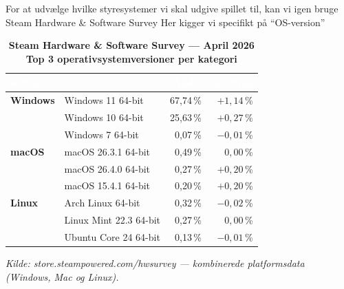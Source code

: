 For at udvælge hvilke styresystemer vi skal udgive spillet til, kan vi igen bruge Steam Hardware \& Software Survey Her kigger vi specifikt på ``OS-version''

\begin{table}[H]
\centering
\caption*{\large\bfseries Steam Hardware \& Software Survey --- April 2026\\[4pt]
\normalsize\normalfont Top 3 operativsystemversioner per kategori}
\vspace{6pt}
\renewcommand{\arraystretch}{1.4}
\begin{tabular}{
  l
  l
  r
  r
}
\toprule
\rowcolor{steamblue}
\textcolor{white}{\textbf{Kategori}} &
\textcolor{white}{\textbf{OS-version}} &
\textcolor{white}{\textbf{Andel}} &
\textcolor{white}{\textbf{Ændring}} \\
\midrule
 
\textcolor{windowsgreen}{\textbf{Windows}} & Windows 11 64-bit  & 67{,}74\,\% & $+1{,}14$\,\% \\
\rowcolor{rowgray}
                  & Windows 10 64-bit  & 25{,}63\,\% & $+0{,}27$\,\% \\
                  & Windows 7 64-bit   &  0{,}07\,\% & $-0{,}01$\,\% \\
\midrule
 
\rowcolor{rowgray}
\textcolor{macgray}{\textbf{macOS}} & macOS 26.3.1 64-bit  & 0{,}49\,\% & $0{,}00$\,\% \\
                  & macOS 26.4.0 64-bit  & 0{,}27\,\% & $+0{,}20$\,\% \\
\rowcolor{rowgray}
                  & macOS 15.4.1 64-bit  & 0{,}20\,\% & $+0{,}20$\,\% \\
\midrule
 
\textcolor{linuxorange}{\textbf{Linux}} & Arch Linux 64-bit      & 0{,}32\,\% & $-0{,}02$\,\% \\
\rowcolor{rowgray}
                  & Linux Mint 22.3 64-bit & 0{,}27\,\% & $0{,}00$\,\% \\
                  & Ubuntu Core 24 64-bit  & 0{,}13\,\% & $-0{,}01$\,\% \\
 
\bottomrule
\end{tabular}
 
\vspace{6pt}
\footnotesize\textit{Kilde: store.steampowered.com/hwsurvey — kombinerede platformsdata (Windows, Mac og Linux).}
\end{table}

